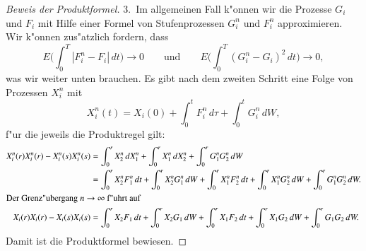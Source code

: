 \begin{proof}[Beweis der Produktformel]
3.~Im allgemeinen Fall k"onnen wir die Prozesse $G_i$ und $F_i$ mit Hilfe
einer Formel von Stufenprozessen $G_i^n$ und $F_i^n$ approximieren.
Wir k"onnen zus"atzlich fordern, dass
\[
E\biggl(\int_0^T |F_i^n-F_i|\,dt\biggr)\to 0
\qquad\text{und}\qquad
E\biggl(\int_0^T (G_i^n-G_i)^2\,dt\biggr)\to 0,
\]
was wir weiter unten brauchen.
Es gibt nach dem zweiten Schritt eine Folge von Prozessen $X_i^n$ mit
\[
X_i^n(t) = X_i(0) + \int_0^t F_i^n\,d\tau + \int_0^t G_i^n\,dW,
\]
f"ur die jeweils die Produktregel gilt:
\begin{align*}
X_i^n(r)X_i^n(r)-X_i^n(s)X_i^n(s)
&=
\int_0^r X_2^n\,dX_1^n+\int_0^r X_1^n\,dX_2^n + \int_0^r G_1^nG_2^n\,dW
\\
&=
\int_0^r X_2^nF_1^n\,dt
+
\int_0^r X_2^nG_1^n\,dW
+
\int_0^r X_1^nF_2^n\,dt
+
\int_0^r X_1^nG_2^n\,dW
+
\int_0^r G_1^nG_2^n\,dW.
\\
\intertext{Der Grenz"ubergang $n\to\infty$ f"uhrt auf}
X_i(r)X_i(r)-X_i(s)X_i(s)
&=
\int_0^r X_2F_1\,dt
+
\int_0^r X_2G_1\,dW
+
\int_0^r X_1F_2\,dt
+
\int_0^r X_1G_2\,dW
+
\int_0^r G_1G_2\,dW.
\end{align*}
Damit ist die Produktformel bewiesen.
\end{proof}

